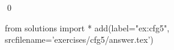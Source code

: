 
\begin{ex} 
  \label{ex:cfg5}
  
  \qed
\end{ex} 
\begin{python0}
from solutions import *
add(label="ex:cfg5",
    srcfilename='exercises/cfg5/answer.tex') 
\end{python0}
